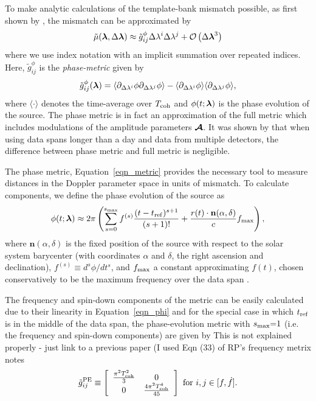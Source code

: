 \documentclass[aps, prd, twocolumn, superscriptaddress, floatfix, showpacs, nofootinbib, longbibliography]{revtex4-1}
\newcommand{\addtext}[1]{\textcolor{green!50!black}{#1}}
\newcommand{\meta}[1]{\addtext{#1}}
\begin{document}
To make analytic calculations of the template-bank mismatch possible, as first shown by
\citet{brady1998}, the mismatch can be approximated by
\begin{equation}
\tilde{\mu}(\boldsymbol{\mathbf{\lambda}}, \Delta\boldsymbol{\mathbf{\lambda}}) \approx
\tilde{g}_{ij}^\phi \Delta\lambda^{i}\Delta\lambda^{j}
+ \mathcal{O}\left(\Delta\boldsymbol{\mathbf{\lambda}}^{3}\right)
\label{eqn_mutilde_expansion}
\end{equation}
where we use index notation with an implicit summation over repeated indices.
Here, $\tilde{g}_{ij}^{\phi}$ is the \emph{phase-metric} given by
\begin{align}
\tilde{g}_{ij}^\phi (\boldsymbol{\mathbf{\lambda}}) =
\langle
\partial_{\Delta\lambda^{i}}\phi
\partial_{\Delta\lambda^{j}}\phi
\rangle
-
\langle
\partial_{\Delta\lambda^{i}}\phi
\rangle
\langle
\partial_{\Delta\lambda^{j}}\phi
\rangle,
\label{eqn_metric}
\end{align}
where $\langle \cdot \rangle$ denotes the time-average over $T_{\rm coh}$ and
$\phi(t; \boldsymbol{\mathbf{\lambda}})$ is the phase evolution of the source. The phase metric is
in fact an approximation of the full metric which includes modulations of the
amplitude parameters $\boldsymbol{\mathcal{A}}$. It was shown by \citet{prix2007metric} that
when using data spans longer than a day and data from multiple detectors, the
difference between phase metric and full metric is negligible.

The phase metric, Equation~\eqref{eqn_metric} provides the necessary tool to
measure distances in the Doppler parameter space in units of mismatch. To
calculate components, we define the phase evolution
of the source as \citep{wette2015}
\begin{align}
\phi(t; \boldsymbol{\mathbf{\lambda}}) \approx 2\pi\left(
\sum_{s=0}^{s_{\textrm{max}}} f^{(s)}\frac{(t-t_{\rm ref})^{s+1}}{(s+1)!}
+ \frac{r(t)\cdot\mathbf{n}(\alpha, \delta)}{c} f_{\textrm{max}}\right),
\label{eqn_phi}
\end{align}
where $\mathbf{n}(\alpha, \delta)$ is the fixed position of the source with
respect to the solar system barycenter (with coordinates $\alpha$ and $\delta$,
the right ascension and declination), $f^{(s)}\equiv d^{s}\phi/dt^s$, and
$f_{\textrm{max}}$ a constant approximating $f(t)$, chosen conservatively to be the
maximum frequency over the data span \citep{wette2013}.

The frequency and spin-down components of the metric can be easily calculated
due to their linearity in Equation~\eqref{eqn_phi} and for the special case in
which $t_{\rm ref}$ is in the middle of the data span, the phase-evolution metric
with $s_{\textrm{max}}{=}1$ (i.e. the frequency and spin-down components) are given by
\meta{This is not explained properly - just link to a previous paper (I used Eqn (33) of RP's frequency metrix notes}
\begin{equation}
\tilde{g}^{\textrm{PE}}_{ij} \equiv
\left[
\begin{array}{cc}
\frac{\pi^{2}T_{\rm coh}^{2}}{3} & 0 \\
0 & \frac{4\pi^{2}T_{\rm coh}^{4}}{45}
\end{array}
\right]
\textrm{ for } i, j \in [f, \dot{f}].
\end{equation}
\end{document}
